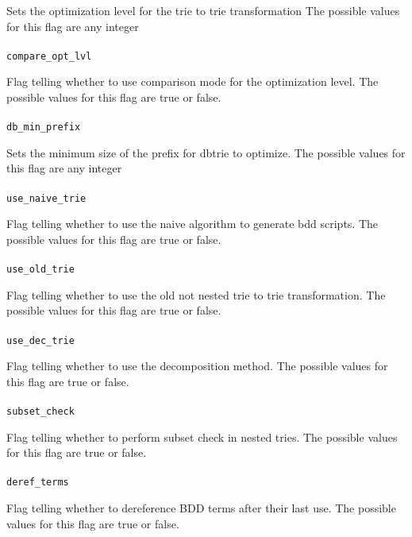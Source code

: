 \documentclass[a4paper,12pt]{article}
\begin{document}
Sets the optimization level for the trie to trie transformation
The possible values for this flag are any integer 
\paragraph{}
\texttt{compare\_opt\_lvl}

Flag telling whether to use comparison mode for the optimization level.
The possible values for this flag are true or false.
\paragraph{}
\texttt{db\_min\_prefix}

Sets the minimum size of the prefix for dbtrie to optimize. 
The possible values for this flag are any integer 
\paragraph{}
\texttt{use\_naive\_trie}

Flag telling whether to use the naive algorithm to generate bdd scripts.
The possible values for this flag are true or false.
\paragraph{}
\texttt{use\_old\_trie}

Flag telling whether to use the old not nested trie to trie transformation.
The possible values for this flag are true or false.
\paragraph{}
\texttt{use\_dec\_trie}

Flag telling whether to use the decomposition method.
The possible values for this flag are true or false.
\paragraph{}
\texttt{subset\_check}

Flag telling whether to perform subset check in nested tries.
The possible values for this flag are true or false.
\paragraph{}
\texttt{deref\_terms}

Flag telling whether to dereference BDD terms after their last use.
The possible values for this flag are true or false.
\end{document}

